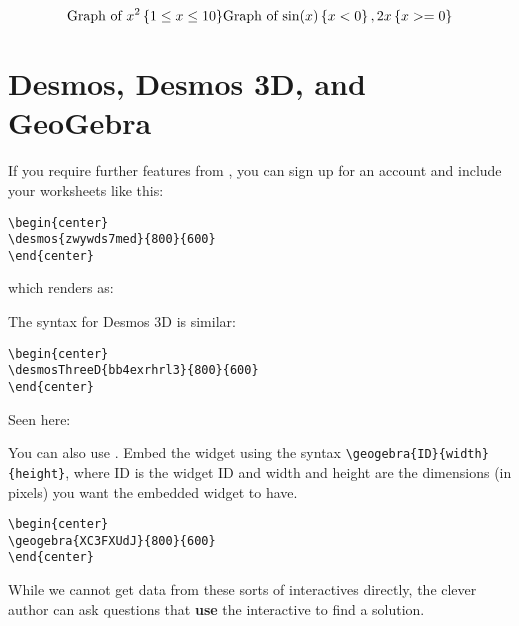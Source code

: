 \documentclass{ximera}
\begin{document}
\[
  \text{Graph of $x^2 \left\{ 1 \leq x \leq 10 \right\}$}
  \text{Graph of $ \sin(x)\left\{x<0\right\}, 2x\left\{ x>=0 \right\} $}
\]


\section{Desmos, Desmos 3D, and GeoGebra}

If you require further features from
, you can sign up for an account
and include your worksheets like this:
\begin{verbatim}
\begin{center}
\desmos{zwywds7med}{800}{600}
\end{center}
\end{verbatim}
which renders as:
\begin{center}
\end{center}

\providecommand{\desmosThreeD}[3]{}   %

The syntax for Desmos 3D is similar:
\begin{verbatim}
\begin{center}
\desmosThreeD{bb4exrhrl3}{800}{600}
\end{center}
\end{verbatim}
Seen here:
\begin{center}
  \desmosThreeD{bb4exrhrl3}{800}{600}
\end{center}

You can also use . Embed the
widget using the syntax \verb|\geogebra{ID}{width}{height}|, where ID
is the widget ID and width and height are the dimensions (in pixels)
you want the embedded widget to have.
\begin{verbatim}
\begin{center}
\geogebra{XC3FXUdJ}{800}{600}
\end{center}
\end{verbatim}
\begin{center}
\end{center}

While we cannot get data from these sorts of interactives directly, the clever
author can ask questions that \textbf{use} the interactive to find a solution.
\end{document}
